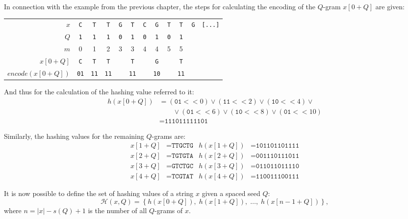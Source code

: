 \begin{example}
	In connection with the example from the previous chapter, the steps for calculating the encoding of the $Q$-gram $x[0 + Q]$ are given:
	
	\begin{center}
		\begin{tabular}{r || ccccccccccc}
			$x$ & \texttt{C} & \texttt{T} & \texttt{T} & \texttt{G} & \texttt{T} & \texttt{C} & \texttt{G} & \texttt{T} & \texttt{T} & \texttt{G} & \texttt{[...]} \\
			$Q$ & \texttt{1} & \texttt{1} & \texttt{1} & \texttt{0} & \texttt{1} & \texttt{0} & \texttt{1} & \texttt{0} & \texttt{1} & & \\
			$m$ & 0 & 1 & 2 & 3 & 3 & 4 & 4 & 5 & 5 & & \\
			$x[0 + Q]$ & \texttt{C} & \texttt{T} & \texttt{T} & & \texttt{T} & & \texttt{G} & & \texttt{T} & & \\
			$encode(x[0 + Q])$ & \texttt{01} & \texttt{11} & \texttt{11} & & \texttt{11} & & \texttt{10} & & \texttt{11} & & \\
		\end{tabular}
		
	\end{center}

	And thus for the calculation of the hashing value referred to it: \begin{align*}
		h\left( x[0 + Q] \right) &= (\texttt{01} <\!< 0) \vee (\texttt{11} <\!< 2) \vee (\texttt{10} <\!< 4) \vee {} \\
		&\qquad {} \vee (\texttt{01} <\!< 6) \vee (\texttt{10} <\!< 8) \vee (\texttt{01} <\!< 10) \\
		&= \texttt{111011111101} 
	\end{align*}
	
	Similarly, the hashing values for the remaining $Q$-grams are: \begin{align*}
		x[1 + Q] &= \texttt{TTGCTG}  &  h(x[1 + Q]) &= \texttt{101101101111} \\
		x[2 + Q] &= \texttt{TGTGTA}  &  h(x[2 + Q]) &= \texttt{001110111011} \\
		x[3 + Q] &= \texttt{GTCTGC}  &  h(x[3 + Q]) &= \texttt{011011011110} \\
		x[4 + Q] &= \texttt{TCGTAT}  &  h(x[4 + Q]) &= \texttt{110011100111}
	\end{align*}
\end{example}

It is now possible to define the set of hashing values of a string $x$ given a spaced seed $Q$: \[ \mathcal{H}(x, Q) = \left\{ h(x[0 + Q]),\; h(x[1 + Q]),\; \dots,\; h(x[n - 1 + Q]) \right\}, \] where $n = |x| - s(Q) + 1$ is the number of all $Q$-grams of $x$.

